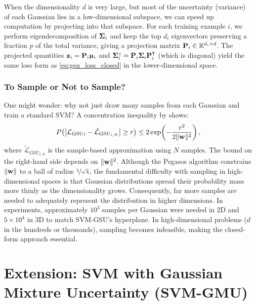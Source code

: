 \documentclass[11pt, letterpaper]{article}
\newcommand{\bSigma}{\vb{\Sigma}}
\newcommand{\bmu}{\boldsymbol{\upmu}}
\newcommand{\R}{\mathbb{R}}
\newcommand{\loss}{\mathcal{L}}
\begin{document}
When the dimensionality $d$ is very large, but most of the uncertainty (variance) of each Gaussian lies in a low-dimensional subspace, we can speed up computation by projecting into that subspace. For each training example $i$, we perform eigendecomposition of $\bSigma_i$ and keep the top $d_i$ eigenvectors preserving a fraction $p$ of the total variance, giving a projection matrix $\vb{P}_i \in \R^{d_i \times d}$. The projected quantities $\vb{z}_i = \vb{P}_i \bmu_i$ and $\bSigma_i^z = \vb{P}_i \bSigma_i \vb{P}_i^{\intercal}$ (which is diagonal) yield the same loss form as \cref{eq:gsu_loss_closed} in the lower-dimensional space.


\section{To Sample or Not to Sample?}\label{sec:sampling}

One might wonder: why not just draw many samples from each Gaussian and train a standard SVM? A concentration inequality by \textcite{cirel2006norms} shows:
\begin{equation}\label{eq:concentration}
    P\!\left(\left|{\loss_{\text{GSU}}}_{i} - \tilde{\loss}_{{\text{GSU}}_{i,N}}\right| \geq r\right) \leq 2\exp\!\left(-\frac{r^2}{2\|\vb{w}\|^2}\right),
\end{equation}
where $\tilde{\loss}_{{\text{GSU}}_{i,N}}$ is the sample-based approximation using $N$ samples. The bound on the right-hand side depends on $\|\vb{w}\|^2$. Although the Pegasos algorithm constrains $\|\vb{w}\|$ to a ball of radius $\nicefrac{1}{\sqrt{\lambda}}$, the fundamental difficulty with sampling in high-dimensional spaces is that Gaussian distributions spread their probability mass more thinly as the dimensionality grows. Consequently, far more samples are needed to adequately represent the distribution in higher dimensions. In experiments, approximately $10^3$ samples per Gaussian were needed in 2D and $5 \times 10^4$ in 3D to match SVM-GSU's hyperplane. In high-dimensional problems ($d$ in the hundreds or thousands), sampling becomes infeasible, making the closed-form approach essential.

\part{Extension: SVM with Gaussian Mixture Uncertainty (SVM-GMU)}
\end{document}
